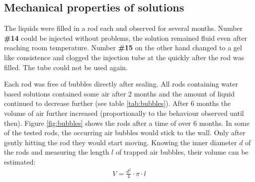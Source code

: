 \clearpage

\subsection{Mechanical properties of solutions}
\label{sec:sol-mech}

The liquids were filled in a rod each and observed for several months.
Number \textbf{\#14} could be injected without problems, the solution remained fluid even after reaching room temperature.
Number \textbf{\#15} on the other hand changed to a gel like consistence and clogged the injection tube at the quickly after the rod was filled.
The tube could not be used again.

Each rod was free of bubbles directly after sealing.
All rods containing water based solutions contained some air after 2 months and the amount of liquid continued to decrease further (see table \ref{tab:bubbles}).
After 6 months the volume of air further increased (proportionally to the behaviour observed until then).
Figure \ref{fig:bubbles} shows the rods after a time of over 6 months.
In some of the tested rods, the occurring air bubbles would stick to the wall.
Only after gently hitting the rod they would start moving.
Knowing the inner diameter $d$ of the rods and measuring the length $l$ of trapped air bubbles, their volume can be estimated:
\begin{align}
 V = \frac{d^2}{4}\cdot \pi \cdot l
\end{align}

